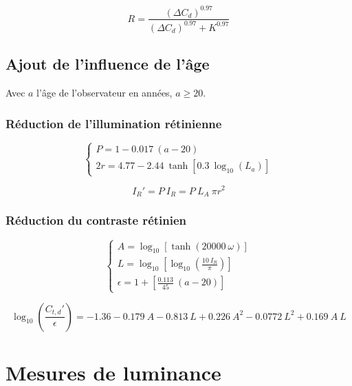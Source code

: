 	\begin{equation}
		R = \frac{(\Delta C_d)^{0.97}}{(\Delta C_d)^{0.97} + K^{0.97}}
		\label{eq:anxe_step_41}
	\end{equation}
	
	\section*{Ajout de l'influence de l'âge}	
	\par Avec $a$ l'âge de l'observateur en années, $a \geq 20$.	
	
	\subsection*{Réduction de l'illumination rétinienne}
	\begin{equation}
		\begin{cases}
		P = 1 - 0.017~(a - 20)\\
		2r = 4.77 - 2.44~\tanh[0.3~\log_{10}(L_a)]
		\end{cases}
		\label{eq:anxe_step_50}
	\end{equation}
	
	\begin{equation}
		I_R' = P~I_R = P~L_A~\pi r^2
		\label{eq:anxe_step_51}
	\end{equation}
	
	\subsection*{Réduction du contraste rétinien}
	\begin{equation}
		\begin{cases}
		A = \log_{10} \left[ \tanh(20000~\omega) \right]\\
		L = \log_{10} \left[ \log_{10} \left( \frac{10~I_R}{\pi} \right) \right]\\
		\epsilon = 1 + \left[ \frac{0.113}{45}~(a - 20) \right]
		\end{cases}
		\label{eq:anxe_step_60}
	\end{equation}
	
	\begin{equation}
		\log_{10} \left( \frac{C_{t,d}'}{\epsilon} \right) = -1.36 -0.179~A - 0.813~L + 0.226~A^2 - 0.0772~L^2 + 0.169~A~L
		\label{eq:anxe_step_61}
	\end{equation}
	
	\chapter*{Mesures de luminance}
	
